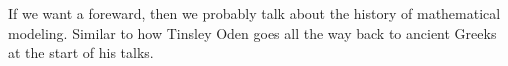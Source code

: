 %
%

\foreword

If we want a foreward, then we probably talk about the history of mathematical modeling. Similar to how Tinsley Oden goes all the way back to ancient Greeks at the start of his talks.


